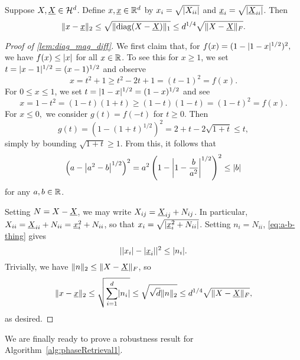 \begin{lemma}
  Suppose $X, \uX \in \H^d$. Define $x, \ux \in \R^d$ by $x_i = \sqrt{\abs{X_{ii}}}$ and $\ux_i = \sqrt{\abs{\uX_{ii}}}$.  Then \[\norm{x - \ux}_2 \le \sqrt{\norm{\diag(X - \uX)}_1} \le d^{1/ 4} \sqrt{\norm{X - \uX}_F}.\]
  \label{lem:diag_mag_diff}
\end{lemma}

\begin{proof}[Proof of \cref{lem:diag_mag_diff}]
  We first claim that, for $f(x) = (1 - \abs{1 - x}^{1 / 2})^2,$ we have $f(x) \le \abs{x}$ for all $x \in \R$.  To see this for $x \ge 1$, we set $t = \abs{x - 1}^{1/2} = (x - 1)^{1/2}$ and observe \[x = t^2 + 1 \ge t^2 - 2t + 1 = (t - 1)^2 = f(x).\]  For $0 \le x \le 1$, we set $t = \abs{1 - x}^{1 / 2} = (1 - x)^{1 / 2}$ and see \[x = 1 - t^2 = (1 - t) (1 + t) \ge (1 - t) (1 - t) = (1 - t)^2 = f(x).\]  For $x \le 0,$ we consider $g(t) = f(-t)$ for $t \ge 0$.  Then \[g(t) = (1 - (1 + t)^{1 / 2})^2 = 2 + t - 2\sqrt{1 + t} \le t,\] simply by bounding $\sqrt{1 + t} \ge 1$.  From this, it follows that \begin{equation} \left(a - \abs*{a^2 - b}^{1 / 2}\right)^2 = a^2 \left(1 - \abs*{1 - \frac{b}{a^2}}^{1 / 2}\right)^2 \le \abs{b} \label{eq:a-b-thing} \end{equation} for any $a, b \in \R$.
  
  Setting $N = X - \uX$, we may write $X_{ij} = \uX_{ij} + N_{ij}$.  In particular, $X_{ii} = \uX_{ii} + N_{ii} = \ux_i^2 + N_{ii}$, so that $x_i = \sqrt{\abs{\ux_i^2 + N_{ii}}}$.  Setting $n_i = N_{ii}$, \eqref{eq:a-b-thing} gives \[\abs{\abs{x_i} - \abs{\ux_i}}^2 \le \abs{n_i}.\]  Trivially, we have $\norm{n}_2 \le \norm{X - \uX}_F$, so \[\norm{x - \ux}_2 \le \sqrt{\sum_{i = 1}^d \abs{n_i}} \le \sqrt{\sqrt{d} \norm{n}_2} \le d^{1 / 4} \sqrt{\norm{X - \uX}_F},\] as desired.
\end{proof}

We are finally ready to prove a robustness result for Algorithm~\ref{alg:phaseRetrieval1}.

